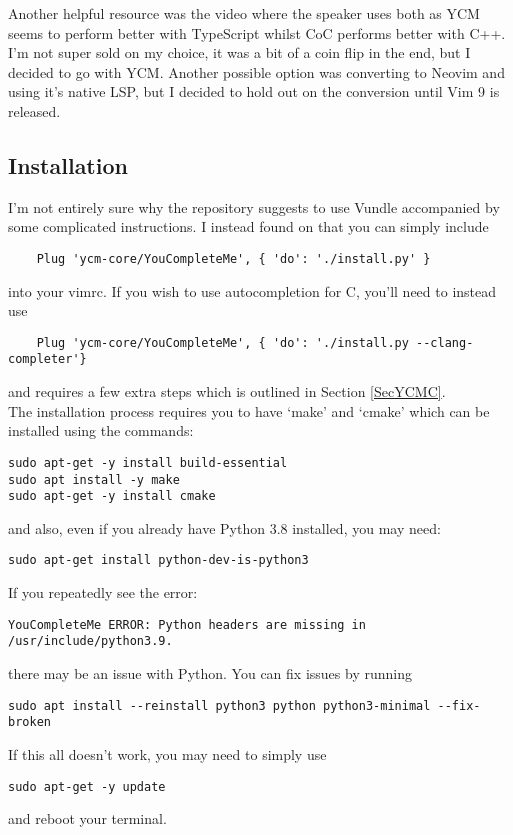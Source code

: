 Another helpful resource was the video \cite{primeagen2020cocvsycm} where the
speaker uses both as YCM seems to perform better with TypeScript whilst CoC
performs better with C++. I'm not super sold on my choice, it was a bit of a
coin flip in the end, but I decided to go with YCM. Another possible option was
converting to Neovim and using it's native LSP, but I decided to hold out on the
conversion until Vim 9 is released.

\subsection{Installation} \label{SecYCMInstallation}
I'm not entirely sure why the repository \cite{ycmcore2017ycm} suggests to use
Vundle accompanied by some complicated instructions. I instead found on
\cite{yves2020why} that you can simply include
\begin{lstlisting}
    Plug 'ycm-core/YouCompleteMe', { 'do': './install.py' }
\end{lstlisting}
into your vimrc. If you wish to use autocompletion for C, you'll need to instead
use
\begin{lstlisting}
    Plug 'ycm-core/YouCompleteMe', { 'do': './install.py --clang-completer'}
\end{lstlisting}
and requires a few extra steps which is outlined in Section \ref{SecYCMC}.\\

The installation process requires you to have `make' and
`cmake' which can be installed using the commands:
\begin{lstlisting}
sudo apt-get -y install build-essential
sudo apt install -y make
sudo apt-get -y install cmake
\end{lstlisting}
and also, even if you already have Python 3.8 installed, you may need:
\begin{lstlisting}
sudo apt-get install python-dev-is-python3
\end{lstlisting}
If you repeatedly see the error:
\begin{lstlisting}
YouCompleteMe ERROR: Python headers are missing in /usr/include/python3.9.
\end{lstlisting}
there may be an issue with Python. You can fix issues by running
\begin{lstlisting}
sudo apt install --reinstall python3 python python3-minimal --fix-broken
\end{lstlisting}
If this all doesn't work, you may need to simply use
\begin{lstlisting}
sudo apt-get -y update
\end{lstlisting}
and reboot your terminal.

